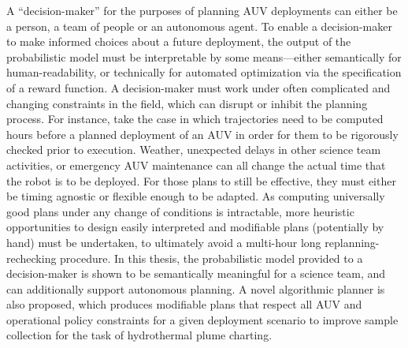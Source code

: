 A ``decision-maker'' for the purposes of planning AUV deployments can either be a person, a team of people or an autonomous agent.  
To enable a decision-maker to make informed choices about a future deployment, the output of the probabilistic model must be interpretable by some means---either semantically for human-readability, or technically for automated optimization via the specification of a reward function.
A decision-maker must work under often complicated and changing constraints in the field, which can disrupt or inhibit the planning process.
For instance, take the case in which trajectories need to be computed hours before a planned deployment of an AUV in order for them to be rigorously checked prior to execution.
Weather, unexpected delays in other science team activities, or emergency AUV maintenance can all change the actual time that the robot is to be deployed.
For those plans to still be effective, they must either be timing agnostic or flexible enough to be adapted.
As computing universally good plans under any change of conditions is intractable, more heuristic opportunities to design easily interpreted and modifiable plans (potentially by hand) must be undertaken, to ultimately avoid a multi-hour long replanning-rechecking procedure.
In this thesis, the probabilistic model provided to a decision-maker is shown to be semantically meaningful for a science team, and can additionally support autonomous planning.
A novel algorithmic planner is also proposed, which produces modifiable plans that respect all AUV and operational policy constraints for a given deployment scenario to improve sample collection for the task of hydrothermal plume charting.
 

